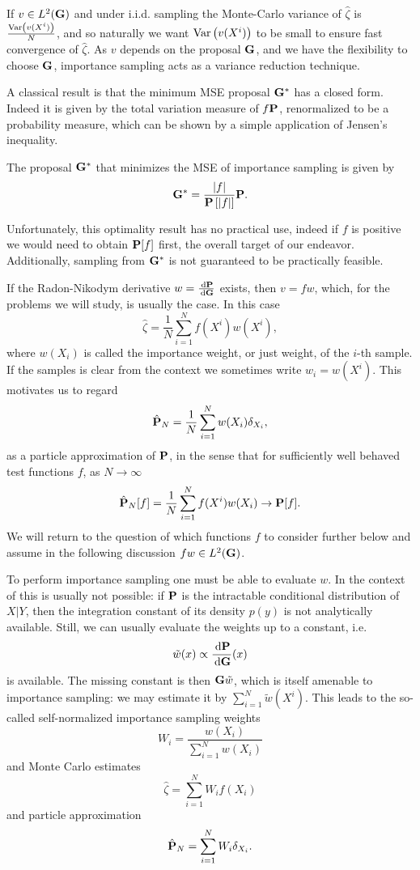 If $v \in L^{2}(\G)$ and under i.i.d. sampling the Monte-Carlo variance of $\hat \zeta$ is $\frac{\var \left(v(X^{i})\right)}{N}$, and so naturally we want $\var \left(v(X^{i})\right)$ to be small to ensure fast convergence of $\hat \zeta$. As $v$ depends on the proposal $\G$, and we have the flexibility to choose $\G$, importance sampling acts as a variance reduction technique. 

A classical result is that the minimum MSE proposal $\G^\ast$ has a closed form. Indeed it is given by the total variation measure of $f\P$, renormalized to be a probability measure, which can be shown by a simple application of Jensen's inequality. 
\begin{proposition}
    \label{prop:minimum_MSE_IS}
    The proposal $\G^{\ast}$ that minimizes the MSE of importance sampling is given by
    $$
    \G^{\ast}  = \frac{\lvert f \rvert}{\P\left[\lvert f \rvert \right]} \P.
    $$
\end{proposition}
Unfortunately, this optimality result has no practical use, indeed if $f$ is positive we would need to obtain $\P[f]$ first, the overall target of our endeavor. Additionally, sampling from $\G^{\ast}$ is not guaranteed to be practically feasible. 

If the Radon-Nikodym derivative $w = \frac{\d\P}{\d\G}$ exists, then $v = fw$, which, for the problems we will study, is usually the case. In this case 
$$
\hat \zeta = \frac{1}{N} \sum_{i = 1}^N f(X^{i})w(X^{i}),
$$
where $w(X_{i})$ is called the importance weight, or just weight, of the $i$-th sample. If the samples is clear from the context we sometimes write $w_{i} = w(X^{i})$. 
This motivates us to regard
\begin{align}
\label{eq:is-particle-approximation}
\hat \P_N = \frac{1}{N} \sum_{i = 1}^{N} w(X_i) \delta_{X_i},
\end{align}
as a particle approximation of $\P$, in the sense that for sufficiently well behaved test functions $f$, as $N \to \infty$ $$
\hat\P_{N}[f] = \frac{1}{N} \sum_{i = 1}^N f(X^{i})w(X_{i})\to \P [f].
$$
We will return to the question of which functions $f$ to consider further below and assume in the following discussion $fw \in L^{2}(\G)$.

To perform importance sampling one must be able to evaluate $w$. In the context of  this is usually not possible: if $\P$ is the intractable conditional distribution of $X|Y$, then the integration constant of its density $p(y)$ is not analytically available.
Still, we can usually evaluate the weights up to a constant, i.e. $$\tilde w(x) \propto \frac{\d \P}{\d \G}(x)$$ is available. The missing constant is then $\G \tilde w$, which is itself amenable to importance sampling: we may estimate it by $\sum_{i = 1}^N \tilde w(X^{i})$.
This leads to the so-called self-normalized importance sampling weights $$W_i = \frac{w(X_i)}{\sum_{i = 1}^N w(X_i)}$$ and Monte Carlo estimates $$\hat \zeta = \sum_{i = 1}^{N} W_i f(X_i)$$ and particle approximation $$\hat \P_N = \sum_{i = 1}^{N} W_i \delta_{X_i}.$$

